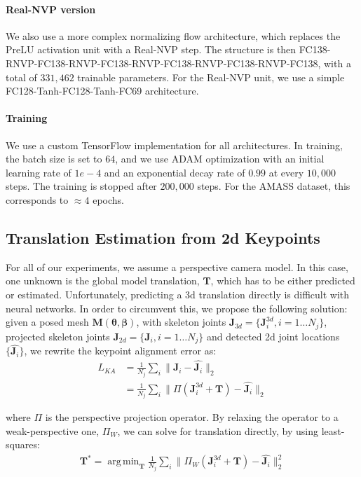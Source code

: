 \documentclass[runningheads]{llncs}
\newcommand{\thetab}{\bm{\theta}}
\newcommand{\betab}{\bm{\beta}}
\DeclareMathOperator*{\argmin}{arg\,min}
\begin{document}
\paragraph{Real-NVP version} We also use a more complex normalizing flow architecture, which replaces the PreLU activation unit with a Real-NVP step. The structure is then FC138-RNVP-FC138-RNVP-FC138-RNVP-FC138-RNVP-FC138-RNVP-FC138, with a total of $331,462$ trainable parameters. For the Real-NVP unit, we use a simple FC128-Tanh-FC128-Tanh-FC69 architecture. 

\paragraph{Training} We use a custom TensorFlow implementation for all architectures. In training, the batch size is set to $64$, and we use  ADAM optimization with an initial learning rate of $1e-4$ and an exponential decay rate of $0.99$ at every $10,000$ steps. The training is stopped after $200,000$ steps. For the AMASS dataset, this corresponds to $\approx 4$ epochs.

\subsection{Translation Estimation from 2d Keypoints}

For all of our experiments, we assume a perspective camera model. In this case, one unknown is the global model translation, $\mathbf{T}$, which has to be either predicted or estimated.
Unfortunately, predicting a 3d translation directly is difficult with neural networks. In order to circumvent this, we propose the following solution: given a posed mesh $\mathbf{M}(\thetab, \betab)$, with skeleton joints $\mathbf{J}_{3d} = \{ \mathbf{J}^{3d}_{i}, i=1 \ldots N_{j} \}$, projected skeleton joints $\mathbf{J}_{2d} = \{ \mathbf{J}_{i}, i=1 \ldots N_{j} \}$ and detected 2d joint locations $\{\widehat{\mathbf{J}_i}\}$, we rewrite the keypoint alignment error as:
\begin{align}
    L_{KA} &=\frac{1}{N_j}\sum_i \|\mathbf{J}_i - \widehat{\mathbf{J}_i}\|_2 \nonumber\\
           &= \frac{1}{N_j}\sum_i \|\Pi(\mathbf{J}^{3d}_i + \mathbf{T}) - \widehat{\mathbf{J}_i}\|_2
    \label{eq:translation_estimation}
\end{align}

where $\Pi$ is the perspective projection operator. By relaxing the operator to a weak-perspective one, $\Pi_W$, we can solve for  translation directly, by using least-squares:
\begin{align}
    \mathbf{T}^{*} = \argmin_{\mathbf{T}} \frac{1}{N_j}\sum_i \|\Pi_W(\mathbf{J}^{3d}_i + \mathbf{T}) - \widehat{\mathbf{J}_i}\|^{2}_{2}
    \label{eq:translation_lsqr}
\end{align}
\end{document}
